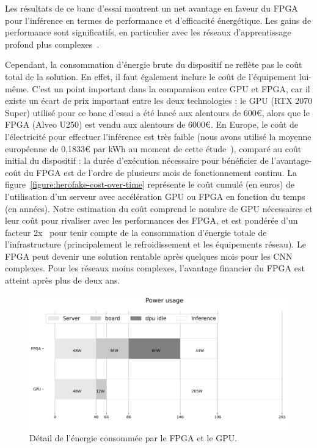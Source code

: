 Les résultats de ce banc d'essai montrent un net avantage en faveur du \gls{FPGA} pour l'inférence en termes de performance et d'efficacité énergétique. Les gains de performance sont significatifs, en particulier avec les réseaux d'apprentissage profond plus complexes~\cite{8782524}.

Cependant, la consommation d'énergie brute du dispositif ne reflète pas le coût total de la solution. En effet, il faut également inclure le coût de l'équipement lui-même. C'est un point important dans la comparaison entre \gls{GPU} et \gls{FPGA}, car il existe un écart de prix important entre les deux technologies : le \gls{GPU} (RTX 2070 Super) utilisé pour ce banc d'essai a été lancé aux alentours de 600€, alors que le \gls{FPGA} (Alveo U250) est vendu aux alentours de 6000€. En Europe, le coût de l'électricité pour effectuer l'inférence est très faible (nous avons utilisé la moyenne européenne de 0,1833€ par kWh au moment de cette étude~\cite{energy-price}), comparé au coût initial du dispositif : la durée d'exécution nécessaire pour bénéficier de l'avantage-coût du \gls{FPGA} est de l'ordre de plusieurs mois de fonctionnement continu. La figure~\ref{figure:herofake-cost-over-time} représente le coût cumulé (en euros) de l'utilisation d'un serveur avec accélération \gls{GPU} ou \gls{FPGA} en fonction du temps (en années). Notre estimation du coût comprend le nombre de \gls{GPU} nécessaires et leur coût pour rivaliser avec les performances des \gls{FPGA}, et est pondérée d'un facteur 2x~\cite{shehabiUnitedStatesData2016} pour tenir compte de la consommation d'énergie totale de l'infrastructure (principalement le refroidissement et les équipements réseau). Le \gls{FPGA} peut devenir une solution rentable après quelques mois pour les \gls{CNN} complexes. Pour les réseaux moins complexes, l'avantage financier du \gls{FPGA} est atteint après plus de deux ans.

\begin{figure}[!ht]
    \centering
    \includegraphics[width=\columnwidth]{4_Chapitre4/figures/characterization/power_usage.png}
    \caption{Détail de l'énergie consommée par le \gls{FPGA} et le \gls{GPU}.}
    \label{figure:herofake-power-usage}
\end{figure}

